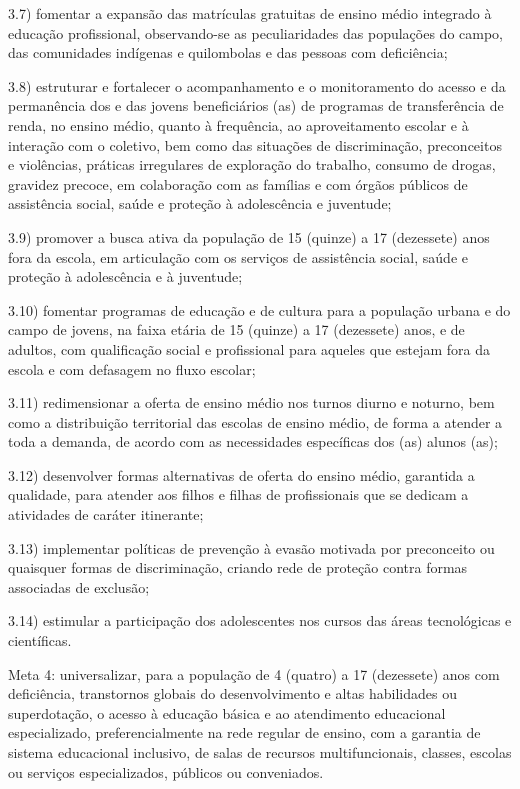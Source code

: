 \documentclass[
]{book}
\begin{document}
3.7) fomentar a expansão das matrículas gratuitas de ensino médio integrado à educação profissional, observando-se as peculiaridades das populações do campo, das comunidades indígenas e quilombolas e das pessoas com deficiência;

3.8) estruturar e fortalecer o acompanhamento e o monitoramento do acesso e da permanência dos e das jovens beneficiários (as) de programas de transferência de renda, no ensino médio, quanto à frequência, ao aproveitamento escolar e à interação com o coletivo, bem como das situações de discriminação, preconceitos e violências, práticas irregulares de exploração do trabalho, consumo de drogas, gravidez precoce, em colaboração com as famílias e com órgãos públicos de assistência social, saúde e proteção à adolescência e juventude;

3.9) promover a busca ativa da população de 15 (quinze) a 17 (dezessete) anos fora da escola, em articulação com os serviços de assistência social, saúde e proteção à adolescência e à juventude;

3.10) fomentar programas de educação e de cultura para a população urbana e do campo de jovens, na faixa etária de 15 (quinze) a 17 (dezessete) anos, e de adultos, com qualificação social e profissional para aqueles que estejam fora da escola e com defasagem no fluxo escolar;

3.11) redimensionar a oferta de ensino médio nos turnos diurno e noturno, bem como a distribuição territorial das escolas de ensino médio, de forma a atender a toda a demanda, de acordo com as necessidades específicas dos (as) alunos (as);

3.12) desenvolver formas alternativas de oferta do ensino médio, garantida a qualidade, para atender aos filhos e filhas de profissionais que se dedicam a atividades de caráter itinerante;

3.13) implementar políticas de prevenção à evasão motivada por preconceito ou quaisquer formas de discriminação, criando rede de proteção contra formas associadas de exclusão;

3.14) estimular a participação dos adolescentes nos cursos das áreas tecnológicas e científicas.

Meta 4: universalizar, para a população de 4 (quatro) a 17 (dezessete) anos com deficiência, transtornos globais do desenvolvimento e altas habilidades ou superdotação, o acesso à educação básica e ao atendimento educacional especializado, preferencialmente na rede regular de ensino, com a garantia de sistema educacional inclusivo, de salas de recursos multifuncionais, classes, escolas ou serviços especializados, públicos ou conveniados.
\end{document}
